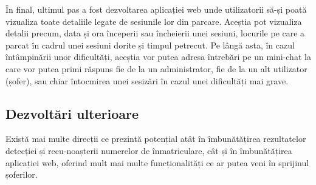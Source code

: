 \documentclass[12pt]{article}
\begin{document}
\^{I}n final, ultimul pas a fost dezvoltarea aplicației web unde utilizatorii s\u{a}-și poat\u{a} vizualiza toate detaliile legate de sesiunile lor din parcare. Aceștia pot vizualiza detalii precum, data și ora \^{i}nceperii sau \^{i}ncheierii unei sesiuni, locurile pe care a parcat \^{i}n cadrul unei sesiuni dorite și timpul petrecut. Pe l\^{a}ng\u{a} asta, \^{i}n cazul \^{i}nt\^{a}mpin\u{a}rii unor dificult\u{a}ți, aceștia vor putea adresa \^{i}ntreb\u{a}ri pe un mini-chat la care vor putea primi r\u{a}spuns fie de la un administrator, fie de la un alt utilizator (șofer), sau chiar \^{i}ntocmirea unei sesiz\u{a}ri \^{i}n cazul unei dificult\u{a}ți mai grave.

\subsection{Dezvolt\u{a}ri ulterioare}

Exist\u{a} mai multe direcții ce prezint\u{a} potențial at\^{a}t \^{i}n \^{i}mbun\u{a}t\u{a}țirea rezultatelor detecției și recu-noașterii numerelor de \^{i}nmatriculare, c\^{a}t și \^{i}n \^{i}mbun\u{a}t\u{a}țirea aplicației web, oferind mult mai multe funcționalit\u{a}ți ce ar putea veni \^{i}n sprijinul șoferilor.
\end{document}
